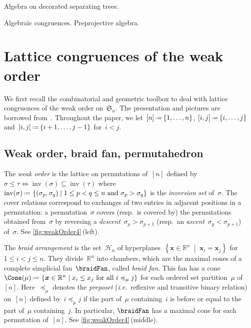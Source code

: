 \documentclass{amsart}
\theoremstyle{definition}
\newcommand{\R}{\mathbb{R}} %
\newcommand{\f}[1]{{\mathfrak{#1}}} %
\renewcommand{\b}[1]{{\boldsymbol{#1}}} %
\newcommand{\set}[2]{\left\{ #1 \;\middle|\; #2 \right\}} %
\newcommand{\bigset}[2]{\big\{ #1 \;\big|\; #2 \big\}} %
\newcommand{\one}{{\mathbb{1}}} %
\newcommand{\eqdef}{\mbox{\,\raisebox{0.2ex}{\scriptsize\ensuremath{\mathrm:}}\ensuremath{=}\,}} %
\DeclareMathOperator{\inv}{inv} %
\newcommand{\ie}{\textit{i.e.}~} %
\newcommand{\darkblue}{\color{darkblue}} %
\newcommand{\defn}[1]{\textsl{\darkblue #1}} %
\newcommand{\vincent}[1]{\todo[color=blue!30]{#1 \\ \hfill --- V.}}
\newcommand{\HA}{\mathcal{H}} %
\newcommand{\hyp}{\mathbb{H}} %
\begin{document}
Algebra on decorated separating trees.

Algebraic congruences. Preprojective algebra.

\vincent{todo}


\clearpage
\section{Lattice congruences of the weak order}
\label{sec:latticeCongruences}

We first recall the combinatorial and geometric toolbox to deal with lattice congruences of the weak order on~$\f{S}_n$.
The presentation and pictures are borrowed from~\cite{PilaudSantos-quotientopes, PadrolPilaudRitter}.
Throughout the paper, we let~$[n] \eqdef \{1, \dots, n\}$, $[i,j] \eqdef \{i, \dots, j\}$ and~${{]i,j[} \eqdef \{i+1, \dots, j-1\}}$ for~$i < j$.


\subsection{Weak order, braid fan, permutahedron}
\label{subsec:weakOrder}

The \defn{weak order} is the lattice on permutations of~$[n]$ defined by ${\sigma \le \tau \iff \inv(\sigma) \subseteq \inv(\tau)}$ where~$\inv(\sigma) \eqdef \set{(\sigma_p, \sigma_q)}{1 \le p < q \le n \text{ and } \sigma_p > \sigma_q}$ is the \defn{inversion set} of~$\sigma$.
The cover relations correspond to exchanges of two entries in adjacent positions in a permutation: a permutation~$\sigma$ covers (resp.~is covered by) the permutations obtained from~$\sigma$ by reversing a \defn{descent}~$\sigma_p > \sigma_{p+1}$ (resp.~an \defn{ascent}~$\sigma_p < \sigma_{p+1}$) of~$\sigma$.
See \cref{fig:weakOrder4}\,(left).

The \defn{braid arrangement} is the set~$\HA_n$ of hyperplanes~$\set{\b{x} \in \R^n}{\b{x}_i = \b{x}_j}$ for ${1 \le i < j \le n}$.
They divide~$\R^n$ into chambers, which are the maximal cones of a complete simplicial fan~$\braidFan$, called \defn{braid fan}.
This fan has a cone~$\Cone(\mu) \eqdef \set{\b{x} \in \R^n}{x_i \le x_j \text{ for all } i \preccurlyeq_\mu j}$ for each ordered set partition~$\mu$ of~$[n]$.
Here~$\preccurlyeq_\mu$ denotes the \defn{preposet} (\ie reflexive and transitive binary relation) on~$[n]$ defined by~$i \preccurlyeq_\mu j$ if the part of~$\mu$ containing~$i$ is before or equal to the part of~$\mu$ containing~$j$.
In particular, $\braidFan$ has a maximal cone for each permutation of~$[n]$.
See \cref{fig:weakOrder4}\,(middle).
\end{document}
